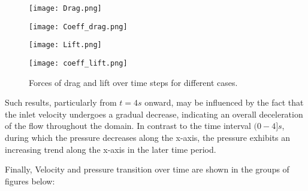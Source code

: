 \documentclass{article}
\begin{document}
\begin{figure}[h]
    \centering
    \begin{minipage}{0.48\textwidth}
        \centering
        \texttt{[image: Drag.png]}
    \end{minipage}\hfill
    \begin{minipage}{0.48\textwidth}
        \centering
        \texttt{[image: Coeff\_drag.png]}
    \end{minipage}

    \begin{minipage}{0.48\textwidth}
        \centering
        \texttt{[image: Lift.png]}
    \end{minipage}\hfill
    \begin{minipage}{0.48\textwidth}
        \centering
        \texttt{[image: coeff\_lift.png]}
    \end{minipage}

    \caption{Forces of drag and lift over time steps for different cases.}
\end{figure}
Such results, particularly from \(t = 4s\) onward, may be influenced by the fact that the inlet velocity undergoes a gradual decrease, indicating an overall deceleration of the flow throughout the domain. In contrast to the time interval \((0-4]s\), during which the pressure decreases along the x-axis, the pressure exhibits an increasing trend along the x-axis in the later time period. 

Finally, Velocity and pressure transition over time are shown in the groups of figures below:
\end{document}
